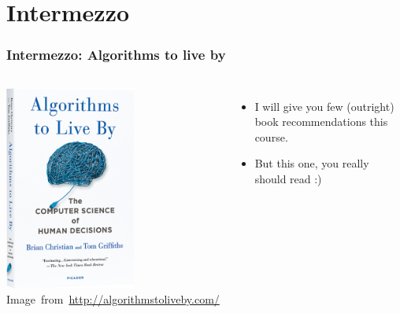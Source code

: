 \section{Intermezzo}
\label{sec:intermezzo}

\begin{frame}
	\frametitle{Intermezzo: Algorithms to live by}
	\begin{columns}
	\begin{center}
		\includegraphics[width=0.6\textwidth]{figures/algorithms-to-live-by.png}\\
		\hspace*{15pt}\hbox{\scriptsize Image from \url{http://algorithmstoliveby.com/}}
	\end{center}
		\begin{itemize}
			\item I will give you few (outright) book recommendations this course.
				\pause
			\item But this one, you really should read :)
		\end{itemize}
	\end{columns}
\end{frame}

